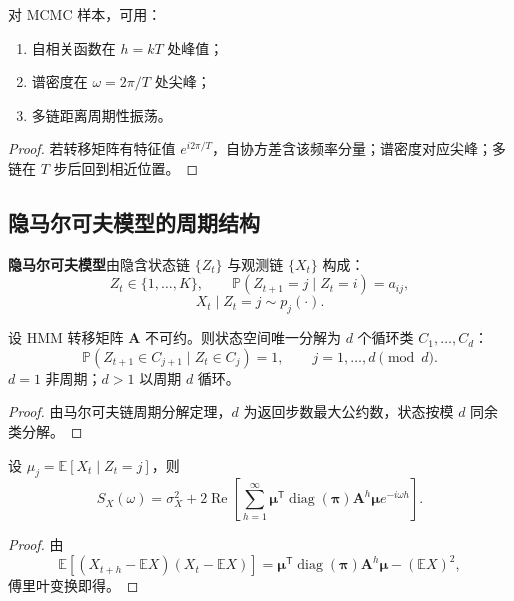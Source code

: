 \begin{proposition}\label{prop:mcmc_periodicity}
对 MCMC 样本，可用：
\begin{enumerate}[label=(\roman*)]
    \item 自相关函数在 $h=kT$ 处峰值；
    \item 谱密度在 $\omega=2\pi/T$ 处尖峰；
    \item 多链距离周期性振荡。
\end{enumerate}
\end{proposition}

\begin{proof}
若转移矩阵有特征值 $e^{i2\pi/T}$，自协方差含该频率分量；谱密度对应尖峰；多链在 $T$ 步后回到相近位置。
\end{proof}

\subsection{隐马尔可夫模型的周期结构}

\begin{definition}[隐马尔可夫模型]\label{def:hmm}
\textbf{隐马尔可夫模型}由隐含状态链 $\{Z_t\}$ 与观测链 $\{X_t\}$ 构成：
\[
Z_t\in\{1,\dots,K\},\qquad \mathbb P(Z_{t+1}=j\mid Z_t=i)=a_{ij},
\]
\[
X_t\mid Z_t=j\sim p_j(\cdot).
\]
\end{definition}

\begin{theorem}\label{thm:hmm_period}
设 HMM 转移矩阵 $\mathbf A$ 不可约。则状态空间唯一分解为 $d$ 个循环类 $C_1,\dots,C_d$：
\[
\mathbb P(Z_{t+1}\in C_{j+1}\mid Z_t\in C_j)=1,\qquad j=1,\dots,d\pmod d.
\]
$d=1$ 非周期；$d>1$ 以周期 $d$ 循环。
\end{theorem}

\begin{proof}
由马尔可夫链周期分解定理，$d$ 为返回步数最大公约数，状态按模 $d$ 同余类分解。
\end{proof}

\begin{proposition}\label{prop:hmm_spectrum}
设 $\mu_j=\mathbb E[X_t\mid Z_t=j]$，则
\[
S_X(\omega)=\sigma_X^2+2\operatorname{Re}\left[\sum_{h=1}^\infty\boldsymbol\mu^{\mathsf T}\operatorname{diag}(\boldsymbol\pi)\mathbf A^h\boldsymbol\mu e^{-i\omega h}\right].
\]
\end{proposition}

\begin{proof}
由
\[
\mathbb E[(X_{t+h}-\mathbb EX)(X_t-\mathbb EX)]
=\boldsymbol\mu^{\mathsf T}\operatorname{diag}(\boldsymbol\pi)\mathbf A^h\boldsymbol\mu-(\mathbb EX)^2,
\]
傅里叶变换即得。
\end{proof}

